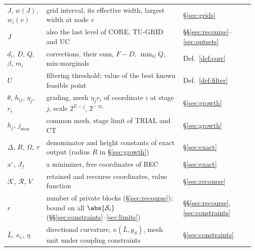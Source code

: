 \begin{table}[htbp]
\begin{tabular}{@{}lll@{}}
$J$, $w(J)$, $w_i(v)$ & grid interval, its effective width, largest width at node $v$ & \S\ref{sec:grids}\\
$J$ & also the last level of CORE, TU-GRID and UC & \S\S\ref{sec:recourse}--\ref{sec:optsets}\\
$d_i$, $D$, $Q$, $\beta$, $m_i$ & corrections, their sum, $F-D$, $\min_GQ$, min-marginals & Def.~\ref{def:corr}\\
$U$ & filtering threshold; value of the best known feasible point & Def.~\ref{def:filter}\\
$\theta$, $h_{ij}$, $\eta_j$, $r_i$ & grading, mesh $\eta_jr_i$ of coordinate $i$ at stage $j$, scale $2^{E-j}$, $2^{-\varpi_i}$ & \S\ref{sec:growth}\\
$h_j$, $j_{\max}$ & common mesh, stage limit of TRIAL and CT & \S\ref{sec:growth}\\
$\Delta$, $R$, $\Omega$, $\tau$ & denominator and height constants of exact output (radius $R$ in \S\ref{sec:growth}) & \S\ref{sec:exact}\\
$x^\circ$, $J_f$ & a minimizer, free coordinates of REC & \S\ref{sec:exact}\\
$\mathcal K$, $\mathcal R$, $V$ & retained and recourse coordinates, value function & \S\ref{sec:recourse}\\
$r$ & number of private blocks (\S\ref{sec:recourse}); bound on all $\abs{\mathcal S_i}$ (\S\S\ref{sec:constraints}--\ref{sec:limits}) & \S\S\ref{sec:recourse}, \ref{sec:constraints}\\
$\bar L$, $\kappa_c$, $\eta$ & directional curvature, $\kappa(\bar L,g_S)$, mesh unit under coupling constraints & \S\ref{sec:constraints}\\
\bottomrule
\end{tabular}
\end{table}

